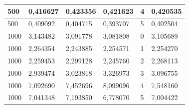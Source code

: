\documentclass[12pt,a4paper,oneside,final]{article}
\begin{document}
\begin{table}[]
\begin{tabular}{|l|l|l|l|l|l|}
500                                                              & 0,416627                                                      & 0,423356                                                      & 0,421623                                                      & 4     & 0,420535                                                               \\ \hline
500                                                              & 0,409092                                                      & 0,404715                                                      & 0,393707                                                      & 5     & 0,402504                                                               \\ \hline
1000                                                             & 3,143482                                                      & 3,091778                                                      & 3,081808                                                      & 0     & 3,105689                                                               \\ \hline
1000                                                             & 2,264354                                                      & 2,243885                                                      & 2,254571                                                      & 1     & 2,254270                                                               \\ \hline
1000                                                             & 2,259453                                                      & 2,299128                                                      & 2,245760                                                      & 2     & 2,268113                                                               \\ \hline
1000                                                             & 2,939474                                                      & 3,023818                                                      & 3,326973                                                      & 3     & 3,096755                                                               \\ \hline
1000                                                             & 7,092690                                                      & 7,452696                                                      & 8,099096                                                      & 4     & 7,548160                                                               \\ \hline
1000                                                             & 7,041348                                                      & 7,193850                                                      & 6,778070                                                      & 5     & 7,004422                                                               \\ \hline
\end{tabular}
\end{table}
\end{document}

